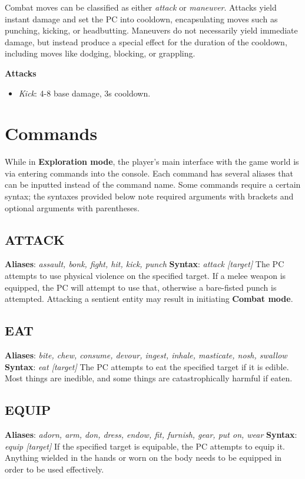 \documentclass[11pt]{article}
\begin{document}
	Combat moves can be classified as either \textit{attack} or \textit{maneuver}. Attacks yield instant damage and set the PC into cooldown, encapsulating moves such as punching, kicking, or headbutting. Maneuvers do not necessarily yield immediate damage, but instead produce a special effect for the duration of the cooldown, including moves like dodging, blocking, or grappling.
	
	\textbf{Attacks}
	
	\begin{itemize}
		\item \textit{Kick}: 4-8 base damage, 3s cooldown.
	\end{itemize}
	
	\section{Commands}
	While in \textbf{Exploration mode}, the player's main interface with the game world is via entering commands into the console. Each command has several aliases that can be inputted instead of the command name. Some commands require a certain syntax; the syntaxes provided below note required arguments with brackets and optional arguments with parentheses.
	\subsection{ATTACK}
	\textbf{Aliases}: \textit{assault, bonk, fight, hit, kick, punch}\newline
	\textbf{Syntax}: \textit{attack [target]}\newline
	The PC attempts to use physical violence on the specified target. If a melee weapon is equipped, the PC will attempt to use that, otherwise a bare-fisted punch is attempted. Attacking a sentient entity may result in initiating \textbf{Combat mode}.
	\subsection{EAT}
	\textbf{Aliases}: \textit{bite, chew, consume, devour, ingest, inhale, masticate, nosh, swallow}\newline
	\textbf{Syntax}: \textit{eat [target]}\newline
	The PC attempts to eat the specified target if it is edible. Most things are inedible, and some things are catastrophically harmful if eaten.
	\subsection{EQUIP}
	\textbf{Aliases}: \textit{adorn, arm, don, dress, endow, fit, furnish, gear, put on, wear}\newline
	\textbf{Syntax}: \textit{equip [target]}\newline
	If the specified target is equipable, the PC attempts to equip it. Anything wielded in the hands or worn on the body needs to be equipped in order to be used effectively.
\end{document}

